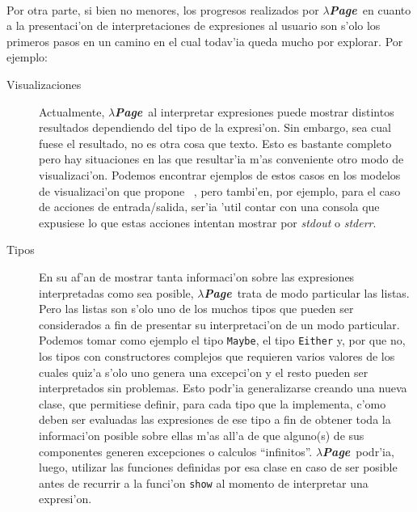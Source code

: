 \documentclass[a4paper]{article}
\newcommand{\hpage}{\textbf{\textsl{$\lambda$Page}}}
\begin{document}
\paragraph{}Por otra parte, si bien no menores, los progresos realizados por \hpage\ en cuanto a la presentaci'on de interpretaciones de expresiones al usuario son s'olo los primeros pasos en un camino en el cual todav'ia queda mucho por explorar.  Por ejemplo:
\begin{description}
	\item[Visualizaciones]Actualmente, \hpage\ al interpretar expresiones puede mostrar distintos resultados dependiendo del tipo de la expresi'on.  Sin embargo, sea cual fuese el resultado, no es otra cosa que texto.  Esto es bastante completo pero hay situaciones en las que resultar'ia m'as conveniente otro modo de visualizaci'on.  Podemos encontrar ejemplos de estos casos en los modelos de visualizaci'on que propone ~\cite{vital}, pero tambi'en, por ejemplo, para el caso de acciones de entrada/salida, ser'ia 'util contar con una consola que expusiese lo que estas acciones intentan mostrar por \textsl{stdout} o \textsl{stderr}.
	\item[Tipos]En su af'an de mostrar tanta informaci'on sobre las expresiones interpretadas como sea posible, \hpage\ trata de modo particular las listas.  Pero las listas son s'olo uno de los muchos tipos que pueden ser considerados a fin de presentar su interpretaci'on de un modo particular.  Podemos tomar como ejemplo el tipo \texttt{Maybe}, el tipo \texttt{Either} y, por que no, los tipos con constructores complejos que requieren varios valores de los cuales quiz'a s'olo uno genera una excepci'on y el resto pueden ser interpretados sin problemas.  Esto podr'ia generalizarse creando una nueva clase, que permitiese definir, para cada tipo que la implementa, c'omo deben ser evaluadas las expresiones de ese tipo a fin de obtener toda la informaci'on posible sobre ellas m'as all'a de que alguno(s) de sus componentes generen excepciones o calculos ``infinitos''.  \hpage\ podr'ia, luego, utilizar las funciones definidas por esa clase en caso de ser posible antes de recurrir a la funci'on \texttt{show} al momento de interpretar una expresi'on.
\end{description}
\end{document}
